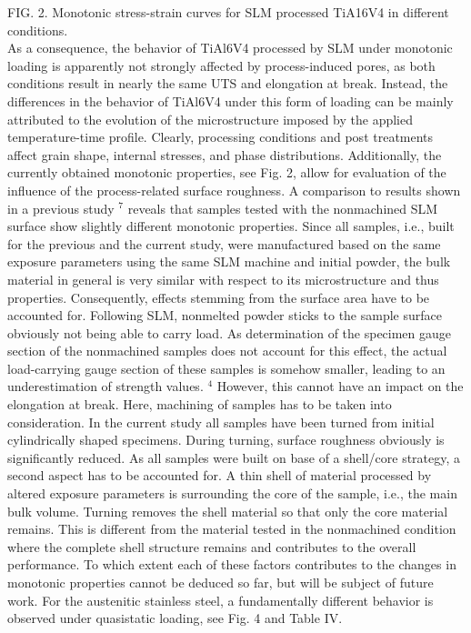 \documentclass[10pt]{article}
\begin{document}
FIG. 2. Monotonic stress-strain curves for SLM processed TiA16V4 in different conditions.\\
As a consequence, the behavior of TiAl6V4 processed by SLM under monotonic loading is apparently not strongly affected by process-induced pores, as both conditions result in nearly the same UTS and elongation at break. Instead, the differences in the behavior of TiAl6V4 under this form of loading can be mainly attributed to the evolution of the microstructure imposed by the applied temperature-time profile. Clearly, processing conditions and post treatments affect grain shape, internal stresses, and phase distributions. Additionally, the currently obtained monotonic properties, see Fig. 2, allow for evaluation of the influence of the process-related surface roughness. A comparison to results shown in a previous study ${ }^{7}$ reveals that samples tested with the nonmachined SLM surface show slightly different monotonic properties. Since all samples, i.e., built for the previous and the current study, were manufactured based on the same exposure parameters using the same SLM machine and initial powder, the bulk material in general is very similar with respect to its microstructure and thus properties. Consequently, effects stemming from the surface area have to be accounted for. Following SLM, nonmelted powder sticks to the sample surface obviously not being able to carry load. As determination of the specimen gauge section of the nonmachined samples does not account for this effect, the actual load-carrying gauge section of these samples is somehow smaller, leading to an underestimation of strength values. ${ }^{4}$ However, this cannot have an impact on the elongation at break. Here, machining of samples has to be taken into consideration. In the current study all samples have been turned from initial cylindrically shaped specimens. During turning, surface roughness obviously is significantly reduced. As all samples were built on base of a shell/core strategy, a second aspect has to be accounted for. A thin shell of material processed by altered exposure parameters is surrounding the core of the sample, i.e., the main bulk volume. Turning removes the shell material so that only the core material remains. This is different from the material tested in the nonmachined condition where the complete shell structure remains and contributes to the overall performance. To which extent each of these factors contributes to the changes in monotonic properties cannot be deduced so far, but will be subject of future work. For the austenitic stainless steel, a fundamentally different behavior is observed under quasistatic loading, see Fig. 4 and Table IV.
\end{document}
